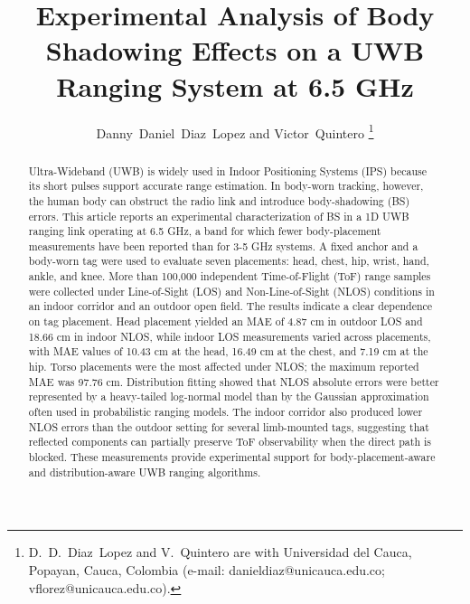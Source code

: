 \documentclass[journal,a4paper,twoside]{IEEEtran}
\begin{document}
\title{\vspace{1cm} Experimental Analysis of Body Shadowing Effects on a UWB Ranging System at 6.5 GHz}

\author{Danny~Daniel~Diaz~Lopez and Victor~Quintero%
\thanks{D.~D.~Diaz~Lopez and V.~Quintero are with Universidad del Cauca, Popayan, Cauca, Colombia (e-mail: danieldiaz@unicauca.edu.co; vflorez@unicauca.edu.co).}%
}

\markboth{}{}

\maketitle
\thispagestyle{fancy}%

\begin{abstract}
Ultra-Wideband (UWB) is widely used in Indoor Positioning Systems (IPS) because its short pulses support accurate range estimation. In body-worn tracking, however, the human body can obstruct the radio link and introduce body-shadowing (BS) errors. This article reports an experimental characterization of BS in a 1D UWB ranging link operating at 6.5 GHz, a band for which fewer body-placement measurements have been reported than for 3-5 GHz systems. A fixed anchor and a body-worn tag were used to evaluate seven placements: head, chest, hip, wrist, hand, ankle, and knee. More than 100,000 independent Time-of-Flight (ToF) range samples were collected under Line-of-Sight (LOS) and Non-Line-of-Sight (NLOS) conditions in an indoor corridor and an outdoor open field. The results indicate a clear dependence on tag placement. Head placement yielded an MAE of 4.87 cm in outdoor LOS and 18.66 cm in indoor NLOS, while indoor LOS measurements varied across placements, with MAE values of 10.43 cm at the head, 16.49 cm at the chest, and 7.19 cm at the hip. Torso placements were the most affected under NLOS; the maximum reported MAE was 97.76 cm. Distribution fitting showed that NLOS absolute errors were better represented by a heavy-tailed log-normal model than by the Gaussian approximation often used in probabilistic ranging models. The indoor corridor also produced lower NLOS errors than the outdoor setting for several limb-mounted tags, suggesting that reflected components can partially preserve ToF observability when the direct path is blocked. These measurements provide experimental support for body-placement-aware and distribution-aware UWB ranging algorithms.
\end{abstract}
\end{document}

